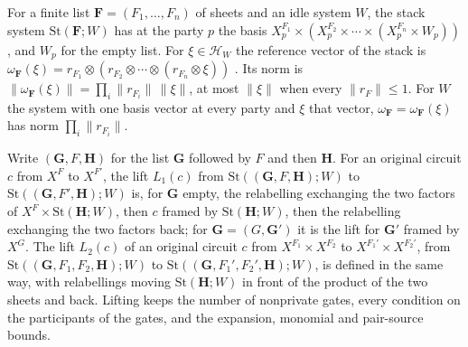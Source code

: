 \begin{definition}
    \label{def:party_sheet_stack}
    \leanok
    For a finite list $\mathbf F=(F_1,\dots,F_n)$ of sheets and an idle system $W$, the stack
    system $\mathrm{St}(\mathbf F;W)$ has at the party $p$ the basis
    $X^{F_1}_p\times(X^{F_2}_p\times\cdots\times(X^{F_n}_p\times W_p))$, and $W_p$ for the empty
    list. For $\xi\in\mathcal H_W$ the reference vector of the stack is
    $\omega_{\mathbf F}(\xi)=r_{F_1}\otimes(r_{F_2}\otimes\cdots\otimes(r_{F_n}\otimes\xi))$
    \cite[Proposition~7.1]{OpenAI2026PolynomialPEPS}. Its norm is
    $\lVert\omega_{\mathbf F}(\xi)\rVert=\prod_i\lVert r_{F_i}\rVert\,\lVert\xi\rVert$, at most
    $\lVert\xi\rVert$ when every $\lVert r_F\rVert\leq1$. For $W$ the system with one basis vector
    at every party and $\xi$ that vector, $\omega_{\mathbf F}=\omega_{\mathbf F}(\xi)$ has norm
    $\prod_i\lVert r_{F_i}\rVert$.

    Write $(\mathbf G,F,\mathbf H)$ for the list $\mathbf G$ followed by $F$ and then $\mathbf H$.
    For an original circuit $c$ from $X^F$ to $X^{F'}$, the lift $L_1(c)$ from
    $\mathrm{St}((\mathbf G,F,\mathbf H);W)$ to $\mathrm{St}((\mathbf G,F',\mathbf H);W)$ is, for
    $\mathbf G$ empty, the relabelling exchanging the two factors of
    $X^F\times\mathrm{St}(\mathbf H;W)$, then $c$ framed by $\mathrm{St}(\mathbf H;W)$, then the
    relabelling exchanging the two factors back; for $\mathbf G=(G,\mathbf G')$ it is the lift
    for $\mathbf G'$ framed by $X^G$. The lift $L_2(c)$ of an original circuit $c$ from
    $X^{F_1}\times X^{F_2}$ to $X^{F_1'}\times X^{F_2'}$, from
    $\mathrm{St}((\mathbf G,F_1,F_2,\mathbf H);W)$ to $\mathrm{St}((\mathbf G,F_1',F_2',\mathbf H);W)$,
    is defined in the same way, with relabellings moving $\mathrm{St}(\mathbf H;W)$ in front of
    the product of the two sheets and back. Lifting keeps the number of nonprivate gates, every
    condition on the participants of the gates, and the expansion, monomial and pair-source
    bounds.
\end{definition}

